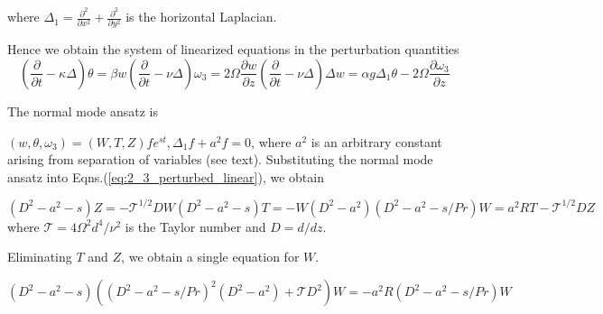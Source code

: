where $\Delta_{1} = \frac{\partial^{2}}{\partial x^{2}} + \frac{\partial^{2}}{\partial y^{2}}$ is the horizontal Laplacian.

Hence we obtain the system of linearized equations in the perturbation quantities
\begin{subequations}\label{eq:2_3_perturbed_linear}
\begin{equation}
 \left(\frac{\partial }{\partial t} - \kappa \Delta \right) \theta = \beta w
 \end{equation}
 \begin{equation}
  \left(\frac{\partial }{\partial t} - \nu \Delta \right) \omega_{3} = 2\Omega\frac{\partial w}{\partial {z}}
 \end{equation}
  \begin{equation}
\left(\frac{\partial }{\partial t} - \nu \Delta \right) \Delta w = \alpha g \Delta_{1} \theta - 2 \Omega \frac{\partial \omega_{3}}{\partial z}
\end{equation}
\end{subequations}

The normal mode ansatz is

$(w, \theta, \omega_{3}) = (W, T, Z)f e^{st}, \Delta_{1} f + a^{2}f = 0$, where $a^{2}$ is an arbitrary constant arising from separation of variables (see text). Substituting the normal mode ansatz into Eqns.(\ref{eq:2_3_perturbed_linear}), we obtain

\begin{subequations}\label{eq:2_3_amplitude}
 \begin{equation}
  (D^{2}-a^{2}-s)Z = -\mathcal{T}^{1/2}DW
 \end{equation}
 
 \begin{equation}
  (D^{2}-a^{2}-s) T = -W
 \end{equation}
 
 \begin{equation}
  (D^{2}-a^{2})(D^{2}-a^{2}-s/Pr)W = a^{2}RT - \mathcal{T}^{1/2}DZ
 \end{equation}
\end{subequations}
where $\mathcal{T} = 4\Omega^{2}d^{4}/\nu^{2}$ is the Taylor number and $D = d/dz$.

Eliminating $T$ and $Z$, we obtain a single equation for $W$.

\begin{equation}
 (D^{2}-a^{2}-s)\left( (D^{2}-a^{2}-s/Pr)^{2}(D^{2}-a^{2}) + \mathcal{T}D^{2}\right)W = -a^{2}R (D^{2}-a^{2}-s/Pr)W
\end{equation}

